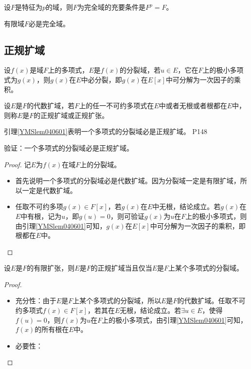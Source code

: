 \begin{theorem}
	设$F$是特征为$p$的域，则$F$为完全域的充要条件是$F^{p}=F$。
\end{theorem}

\begin{corollary}
	有限域$F$必是完全域。
\end{corollary}



\subsection{正规扩域}

\begin{lemma}\label{YMSlem040601}
	设$f(x)$是域$F$上的多项式，$E$是$f(x)$的分裂域，若$u\in E$，它在$F$上的极小多项式为$g(x)$，则$g(x)$在$E$中必分裂，即$g(x)$在$E[x]$中可分解为一次因子的乘积。
\end{lemma}


\begin{definition}
	设$E$是$F$的代数扩域，若$F$上的任一不可约多项式在$E$中或者无根或者根都在$E$中，则称$E$是$F$的正规扩域或正规扩张。
\end{definition}

\original
{
	引理\ref{YMSlem040601}表明一个多项式的分裂域必是正规扩域。
}
{P148}

\begin{proposition}
	验证：一个多项式的分裂域必是正规扩域。
\end{proposition}

\begin{proof}
	记$E$为$f(x)$在域$F$上的分裂域。
	\begin{itemize}
		\item 首先说明一个多项式的分裂域必是代数扩域。因为分裂域一定是有限扩域，所以一定是代数扩域。
		\item 任取不可约多项$g(x)\in F[x]$，若$g(x)$在$E$中无根，结论成立。若$g(x)$在$E$中有根，记为$u$，即$g(u)=0$，则可验证$g(x)$为$u$在$F$上的极小多项式，则由引理\ref{YMSlem040601}可知，$g(x)$在$E[x]$中可分解为一次因子的乘积，即根都在$E$中。
	\end{itemize}
\end{proof}

\begin{theorem}\label{YMSthe040601}
	设$E$是$F$的有限扩张，则$E$是$F$的正规扩域当且仅当$E$是$F$上某个多项式的分裂域。
\end{theorem}

\begin{proof}
	\begin{itemize}
		\item 充分性：由于$E$是$F$上某个多项式的分裂域，所以$E$是$F$的代数扩域。任取不可约多项式$f(x)\in F[x]$，若其在$E$无根，结论成立。若$\exists u\in E$，使得$f(u)=0 $，则$f(x)$为$u$在$F$上的极小多项式，由引理\ref{YMSlem040601}可知，$f(x)$的所有根在$E$中。
		\item 必要性：
	\end{itemize}
\end{proof}

